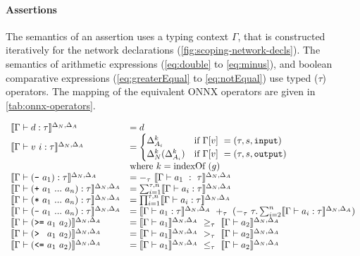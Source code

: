 \paragraph{Assertions}
The semantics of an assertion uses a typing context $\Gamma$, that is constructed iteratively for the network declarations (\autoref{fig:scoping-network-decls}).
The semantics of arithmetic expressions (\autoref{eq:double} to \autoref{eq:minus}), and boolean comparative expressions (\autoref{eq:greaterEqual} to \autoref{eq:notEqual}) use typed ($\tau$) operators. The mapping of the equivalent ONNX operators \cite{onnxOperators} are given in \autoref{tab:onnx-operators}.\

\begin{equation*}
\begin{array}{llll}
    \llbracket \Gamma\vdash{d}:\tau \rrbracket^{\Delta_N,\Delta_A} 
    &= d 
    \\
    \llbracket \Gamma\vdash{v~i}:\tau \rrbracket^{\Delta_N,\Delta_A} 
    &= \begin{cases}
        \Delta_{A_i}^k & \text{if}~\Gamma[v]~= (\tau,s,\texttt{input})\\
        \Delta_{N}^k(\Delta_{A_i}^k) & \text{if}~\Gamma[v]~= (\tau,s,\texttt{output})\\
    \end{cases} 
    \\
    &\text{where}~k = \text{indexOf}~(g)\notag
    \\
    \llbracket \Gamma\vdash(\text{\texttt{-}}~a_1):\tau \rrbracket^{\Delta_N,\Delta_A}
    &= -_\tau~\llbracket \Gamma\vdash{a_1}~:~\tau \rrbracket^{\Delta_N,\Delta_A} 
    \\
    \llbracket \Gamma\vdash(\text{\texttt{+}}~a_1~...~a_n):\tau \rrbracket^{\Delta_N,\Delta_A} 
    &= \sum^{\tau, n}_{i=1}\llbracket \Gamma\vdash{a_i}:\tau \rrbracket^{\Delta_N,\Delta_A} 
    \\
    \llbracket \Gamma\vdash(\text{\texttt{*}}~a_1~...~a_n):\tau \rrbracket^{\Delta_N,\Delta_A} 
    &= \prod^{\tau, n}_{i=1}\llbracket \Gamma\vdash{a_i}:\tau \rrbracket^{\Delta_N,\Delta_A} 
    \\
    \llbracket \Gamma\vdash(\text{\texttt{-}}~a_1~...~a_n):\tau \rrbracket^{\Delta_N,\Delta_A} 
    &= \llbracket \Gamma\vdash{a_1}:\tau \rrbracket^{\Delta_N,\Delta_A}~+_\tau~(-_\tau~\tau.\sum^{n}_{i=2}\llbracket \Gamma\vdash{a_i}:\tau \rrbracket^{\Delta_N,\Delta_A}) 
    \\
    \llbracket \Gamma\vdash(\text{\texttt{>=}}~a_1~a_2) \rrbracket^{\Delta_N,\Delta_A} 
    &= \llbracket \Gamma\vdash{a_1} \rrbracket^{\Delta_N,\Delta_A}~\geq_\tau~\llbracket \Gamma\vdash{a_2} \rrbracket^{\Delta_N,\Delta_A}
    \\
    \llbracket \Gamma\vdash(\text{\texttt{> }}~a_1~a_2) \rrbracket^{\Delta_N,\Delta_A} 
    &= \llbracket \Gamma\vdash{a_1} \rrbracket^{\Delta_N,\Delta_A}~>_\tau~\llbracket \Gamma\vdash{a_2} \rrbracket^{\Delta_N,\Delta_A} 
    \\
    \llbracket \Gamma\vdash(\text{\texttt{<=}}~a_1~a_2) \rrbracket^{\Delta_N,\Delta_A} 
    &= \llbracket \Gamma\vdash{a_1} \rrbracket^{\Delta_N,\Delta_A}~\leq_\tau~\llbracket \Gamma\vdash{a_2} \rrbracket^{\Delta_N,\Delta_A} 

\end{array}
\end{equation*}
